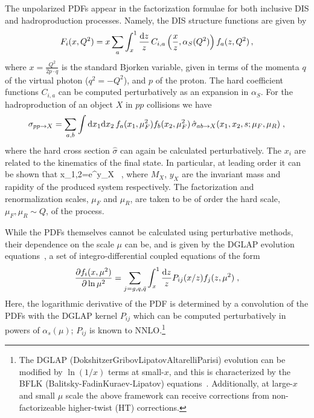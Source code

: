 The unpolarized PDFs appear in the factorization formulae for both inclusive DIS and hadroproduction processes. Namely, the DIS structure functions are given by
\begin{equation}
F_i(x,Q^2)=x\sum_a \int_x^1 \frac{{\rm d}z}{z}\,C_{i,a}\left(\frac{x}{z},\alpha_S(Q^2)\right)f_a(z,Q^2)\, ,
\end{equation}
where $x=\frac{Q^2}{2p\cdot q}$ is the standard Bjorken variable, given in terms of the momenta $q$ of the virtual photon ($q^2=-Q^2$), and $p$ of the proton. 
%
The hard coefficient functions $C_{i,a}$ can be computed perturbatively as an expansion in $\alpha_S$.
%
For the hadroproduction of an object $X$ in $pp$ collisions we have
\begin{equation}
\sigma_{pp\to X}=\sum_{a,b}\int {\rm d}x_1 {\rm d}x_2\, f_a(x_1,\mu_F^2)f_b(x_2,\mu_F^2)\,\hat{\sigma}_{ab\to X}(x_1,x_2,s;\mu_{F},\mu_R)\;,
\end{equation}
where the hard cross section $\hat{\sigma}$ can again be calculated perturbatively. The $x_i$ are related to the kinematics of the final state.
%
In particular, at leading order it can be shown that
\be
x_{1,2}=e^{\pm y_X} \, ,
\ee
where $M_X$, $y_X$ are the invariant mass and rapidity of the produced system respectively.
%
The factorization and renormalization scales, $\mu_F$ and $\mu_R$, are taken to be of order the hard scale, $\mu_F,\mu_R
\sim Q$, of the process.

While the PDFs themselves cannot be calculated using perturbative methods, their dependence on the scale $\mu$ can be, and is given by the  
DGLAP evolution equations~\cite{Dokshitzer:1977sg,Gribov:1972ri,Altarelli:1977zs},
a set of integro-differential coupled equations of the form
\begin{equation}
  \label{eq:dglap}
\frac{\partial f_i(x,\mu^2)}{\partial \ln \mu^2}=\sum_{j=g,q,\bar{q}}\int_x^1 \frac{{\rm d}z}{z}P_{ij}(x/z)f_j(z,\mu^2)\;,
\end{equation}
Here, the logarithmic derivative of the PDF is determined by a convolution
of the PDFs with the DGLAP kernel $P_{ij}$ which can be computed
perturbatively in powers of $\alpha_{s}(\mu)$; $P_{ij}$ is known
to NNLO.\footnote{The DGLAP (Dokshitzer\textendash Gribov\textendash Lipatov\textendash Altarelli\textendash Parisi)
evolution can be modified by $\ln(1/x)$ terms at small-$x$, and
this is characterized by the BFLK (Balitsky-FadinKuraev-Lipatov) equations~\cite{Kuraev:1976ge,Kuraev:1977fs,Balitsky:1978ic}.
%
Additionally, at large-$x$ and small $\mu$ scale the above framework
can receive corrections from non-factorizeable higher-twist (HT) corrections.} 

